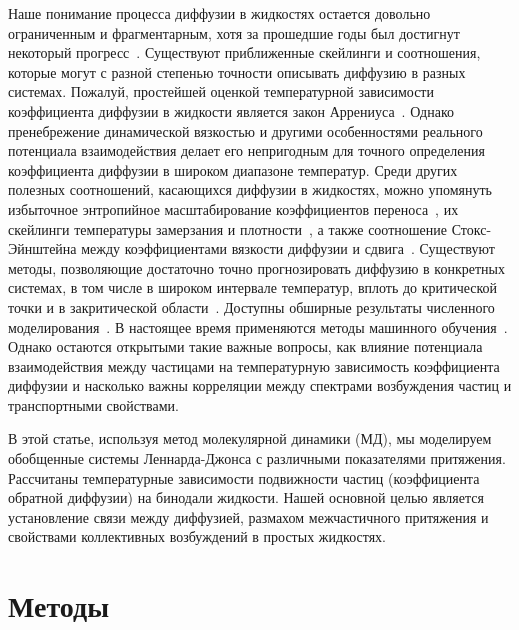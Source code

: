 Наше понимание процесса диффузии в жидкостях остается довольно ограниченным и фрагментарным, хотя за прошедшие годы был достигнут некоторый прогресс~\cite{FrenkelBook,HansenBook,GrootBook,MarchBook}.
Существуют приближенные скейлинги и соотношения, которые могут с разной степенью точности описывать диффузию в разных системах. Пожалуй, простейшей оценкой температурной зависимости коэффициента диффузии в жидкости является закон Аррениуса~\cite{10.1126/science.278.5336.257}. Однако пренебрежение динамической вязкостью и другими особенностями реального потенциала взаимодействия делает его непригодным для точного определения коэффициента диффузии в широком диапазоне температур. Среди других полезных соотношений, касающихся диффузии в жидкостях, можно упомянуть избыточное энтропийное масштабирование коэффициентов переноса~\cite{10.1103/physreva.15.2545, 10.1038/381137a0, 10.1063/1.5055064}, их скейлинги температуры замерзания и плотности~\cite{10.1103/physreve.62.7524, 10.1063/1.5022058, 10.1063/1.5044703, 10.1103/physreve.103.042122}, а также соотношение Стокс-Эйнштейна между коэффициентами вязкости диффузии и сдвига~\cite{10.1063/1.446338, 10.1002/BBPC.19900940313, 10.1103/physreve.95.052122, 10.1063/1.5080662, 10.1080/00268976.2019.1643045}. Существуют методы, позволяющие достаточно точно прогнозировать диффузию в конкретных системах, в том числе в широком интервале температур, вплоть до критической точки и в закритической области~\cite{10.1063/1.1607953, 10.1016/j.camwa.2019.11.012, 10.1063/1.441097}. Доступны обширные результаты численного моделирования~\cite{10.1063/1.1786579, 10.1016/j.fluid.2011.03.002}. В настоящее время применяются методы машинного обучения~\cite{10.1063/5.0011512}.
Однако остаются открытыми такие важные вопросы, как влияние потенциала взаимодействия между частицами на температурную зависимость коэффициента диффузии и насколько важны корреляции между спектрами возбуждения частиц и транспортными свойствами.

В этой статье, используя метод молекулярной динамики (МД), мы моделируем обобщенные системы Леннарда-Джонса с различными показателями притяжения. Рассчитаны температурные зависимости подвижности частиц (коэффициента обратной диффузии) на бинодали жидкости. Нашей основной целью является установление связи между диффузией, размахом межчастичного притяжения и свойствами коллективных возбуждений в простых жидкостях.

\section{Методы}
\label{MACR-SecMethods}

